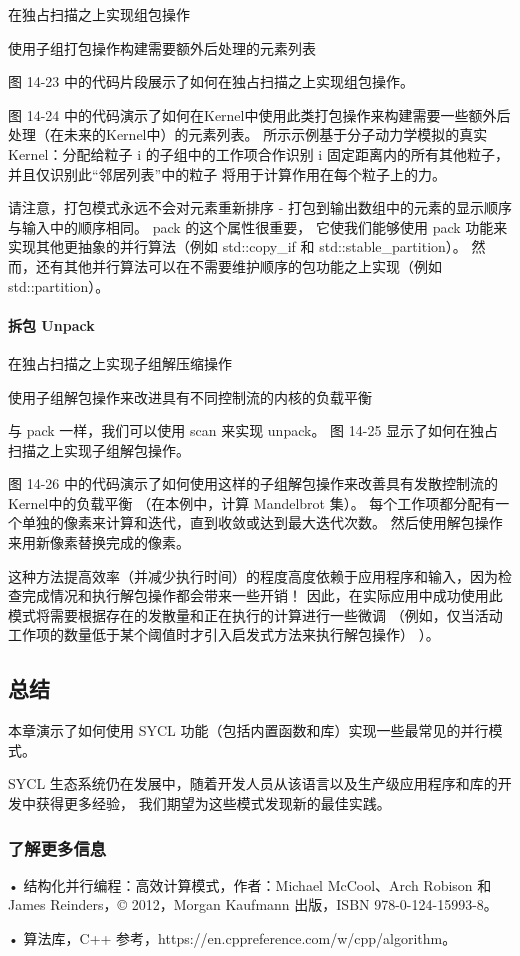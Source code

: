 {\color{red} 在独占扫描之上实现组包操作}

{\color{red} 使用子组打包操作构建需要额外后处理的元素列表}

图 14-23 中的代码片段展示了如何在独占扫描之上实现组包操作。

图 14-24 中的代码演示了如何在Kernel中使用此类打包操作来构建需要一些额外后处理（在未来的Kernel中）的元素列表。 
所示示例基于分子动力学模拟的真实Kernel：分配给粒子 i 的子组中的工作项合作识别 i 固定距离内的所有其他粒子，
并且仅识别此“邻居列表”中的粒子 将用于计算作用在每个粒子上的力。

请注意，打包模式永远不会对元素重新排序 - 打包到输出数组中的元素的显示顺序与输入中的顺序相同。 
pack 的这个属性很重要，
它使我们能够使用 pack 功能来实现其他更抽象的并行算法（例如 std::copy\_if 和 std::stable\_partition）。 
然而，还有其他并行算法可以在不需要维护顺序的包功能之上实现（例如 std::partition）。

\paragraph{拆包 Unpack}

{\color{red} 在独占扫描之上实现子组解压缩操作}

{\color{red} 使用子组解包操作来改进具有不同控制流的内核的负载平衡}

与 pack 一样，我们可以使用 scan 来实现 unpack。 图 14-25 显示了如何在独占扫描之上实现子组解包操作。

图 14-26 中的代码演示了如何使用这样的子组解包操作来改善具有发散控制流的Kernel中的负载平衡
（在本例中，计算 Mandelbrot 集）。 每个工作项都分配有一个单独的像素来计算和迭代，直到收敛或达到最大迭代次数。 
然后使用解包操作来用新像素替换完成的像素。

这种方法提高效率（并减少执行时间）的程度高度依赖于应用程序和输入，因为检查完成情况和执行解包操作都会带来一些开销！ 
因此，在实际应用中成功使用此模式将需要根据存在的发散量和正在执行的计算进行一些微调
（例如，仅当活动工作项的数量低于某个阈值时才引入启发式方法来执行解包操作） ）。

\subsection{总结}
本章演示了如何使用 SYCL 功能（包括内置函数和库）实现一些最常见的并行模式。

SYCL 生态系统仍在发展中，随着开发人员从该语言以及生产级应用程序和库的开发中获得更多经验，
我们期望为这些模式发现新的最佳实践。

\subsubsection{了解更多信息}
• 结构化并行编程：高效计算模式，作者：Michael McCool、Arch Robison 
和 James Reinders，© 2012，Morgan Kaufmann 出版，ISBN 978-0-124-15993-8。

• 算法库，C++ 参考，https://en.cppreference.com/w/cpp/algorithm。